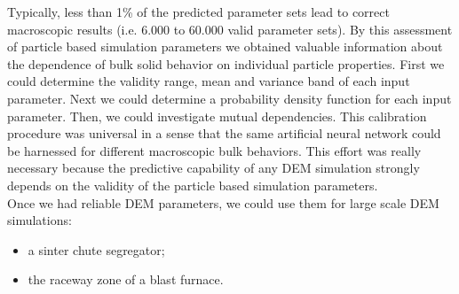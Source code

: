 Typically, less than 1\% of the predicted parameter sets lead to correct
macroscopic results (i.e. 6.000 to 60.000 valid parameter sets).
By this assessment of particle based simulation parameters we obtained valuable
information about the dependence of bulk solid behavior on individual particle properties.
First we could determine the validity range, mean and variance band of each
input parameter. Next we could determine a probability density function for each
input parameter. Then, we could investigate mutual dependencies.
This calibration procedure was universal in a sense that the same artificial
neural network could be harnessed for different macroscopic bulk behaviors.
This effort was really necessary because the predictive capability of any
\acs{DEM} simulation strongly depends on the validity of the particle 
based simulation parameters.\\
Once we had reliable \acs{DEM} parameters, we could use them for large scale \acs{DEM}
simulations:
\begin{itemize}
\item{a sinter chute segregator;}
\item{the raceway zone of a blast furnace.}
\end{itemize}